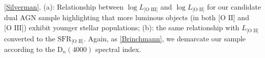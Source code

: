 \label{Silverman} \ref{Silverman}. (a): Relationship between $\log{L_{\text{[O III]}}}$ and $\log{L_{\text{[O II]}}}$ for our candidate dual AGN sample highlighting that more luminous objects (in both $\text{[O II]}$ and $\text{[O III]}$) exhibit younger stellar populations; (b): the same relationship with ${L_{\text{[O II]}}}$ converted to the $\text{SFR}_{\text{[O II]}}$. Again, as \ref{Brinchmann}, we demarcate our sample according to the $\text{D}_{n}(4000)$ spectral index.
  